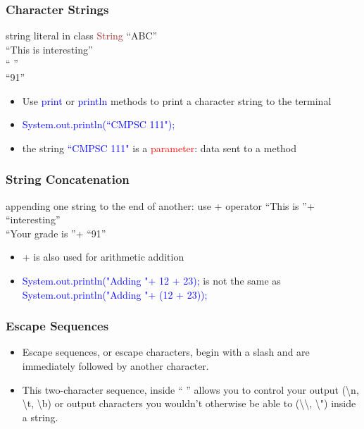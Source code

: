 \documentclass{beamer}
\begin{document}
\begin{frame}
  \frametitle{Character Strings}
  \begin{block}{string literal in class \textcolor{brown}{String}}
  ``ABC'' \\ 
  ``This is interesting''\\
  `` '' \\
  ``91''
  \end{block}
  \pause
\begin{itemize}
	\item Use \textcolor{blue}{print} or \textcolor{blue}{println} methods to print a character string to the terminal
	\item \textcolor{blue}{System.out.println(``CMPSC 111");}
	\item the string \textcolor{blue}{``CMPSC 111"} is a \textcolor{red}{parameter}: data sent to a method
\end{itemize}
\end{frame}
\begin{frame}
  \frametitle{String Concatenation}
  \begin{block}{appending one string to the end of another: use + operator}
  ``This is ''+ ``interesting''\\
  ``Your grade is ''+ ``91''
  \end{block}
  \pause
\begin{itemize}
	\item + is also used for arithmetic addition
	\item \textcolor{blue}{System.out.println("Adding "+ 12 + 23);} is not the same as \textcolor{blue}{System.out.println("Adding "+ (12 + 23));}
\end{itemize}
\end{frame}
\begin{frame}[fragile]
  \frametitle{Escape Sequences}
	\begin{itemize}
		\item Escape sequences, or escape characters, begin with a slash and are immediately followed by another character.  
		\item This two-character sequence, inside `` '' allows you to control your output (\textbackslash n, \textbackslash t, \textbackslash b) or output characters you wouldn't otherwise be able to (\textbackslash\textbackslash, \textbackslash ") inside a string.
    \end{itemize}
\end{frame}
\end{document}
